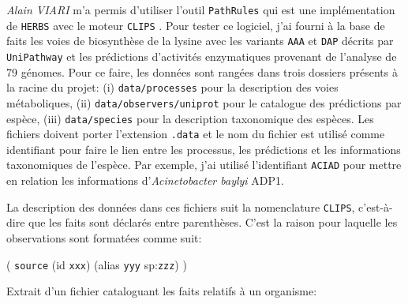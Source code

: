 \begin{refsegment}
\textit{Alain VIARI} m'a permis d'utiliser l'outil \texttt{PathRules} qui est une implémentation de \texttt{\gls{HERBS}} avec le moteur \texttt{\gls{CLIPS}} \cite{riley1991clips}. Pour tester ce logiciel, j'ai fourni à la base de faits les voies de biosynthèse de la lysine avec les variants \texttt{AAA} et \texttt{DAP} décrits par \texttt{UniPathway} et les prédictions d’activités enzymatiques provenant de l’analyse de 79 génomes. Pour ce faire, les données sont rangées dans trois dossiers présents à la racine du projet: (i) \texttt{data/processes} pour la description des voies métaboliques, (ii) \texttt{data/observers/uniprot} pour le catalogue des prédictions par espèce, (iii) \texttt{data/species} pour la description taxonomique des espèces. Les fichiers doivent porter l'extension \texttt{.data} et le nom du fichier est utilisé comme identifiant pour faire le lien entre les processus, les prédictions et les informations taxonomiques de l'espèce. Par exemple, j'ai utilisé l'identifiant \texttt{ACIAD} pour mettre en relation les informations d'\textit{Acinetobacter baylyi} ADP1.



La description des données dans ces fichiers suit la nomenclature \texttt{\gls{CLIPS}}, c'est-à-dire que les faits sont déclarés entre parenthèses. C'est la raison pour laquelle les observations sont formatées comme suit: 

( \texttt{source} (id \texttt{xxx}) (alias \texttt{yyy} sp:\texttt{zzz})  )

Extrait d'un fichier cataloguant les faits relatifs à un organisme:\nolisttopbreak




\end{refsegment}
